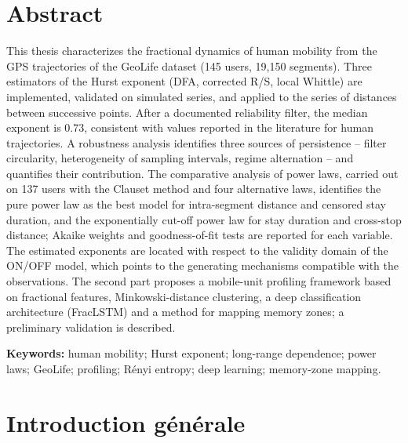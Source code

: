 \chapter*{Abstract}
This thesis characterizes the fractional dynamics of human mobility from the GPS trajectories of the GeoLife dataset (145 users, 19,150 segments). Three estimators of the Hurst exponent (DFA, corrected R/S, local Whittle) are implemented, validated on simulated series, and applied to the series of distances between successive points. After a documented reliability filter, the median exponent is 0.73, consistent with values reported in the literature for human trajectories. A robustness analysis identifies three sources of persistence -- filter circularity, heterogeneity of sampling intervals, regime alternation -- and quantifies their contribution. The comparative analysis of power laws, carried out on 137 users with the Clauset method and four alternative laws, identifies the pure power law as the best model for intra-segment distance and censored stay duration, and the exponentially cut-off power law for stay duration and cross-stop distance; Akaike weights and goodness-of-fit tests are reported for each variable. The estimated exponents are located with respect to the validity domain of the ON/OFF model, which points to the generating mechanisms compatible with the observations. The second part proposes a mobile-unit profiling framework based on fractional features, Minkowski-distance clustering, a deep classification architecture (FracLSTM) and a method for mapping memory zones; a preliminary validation is described.

\textbf{Keywords:} human mobility; Hurst exponent; long-range dependence; power laws; GeoLife; profiling; Rényi entropy; deep learning; memory-zone mapping.

\tableofcontents
\listoffigures
\listoftables

\chapter*{Introduction générale}

